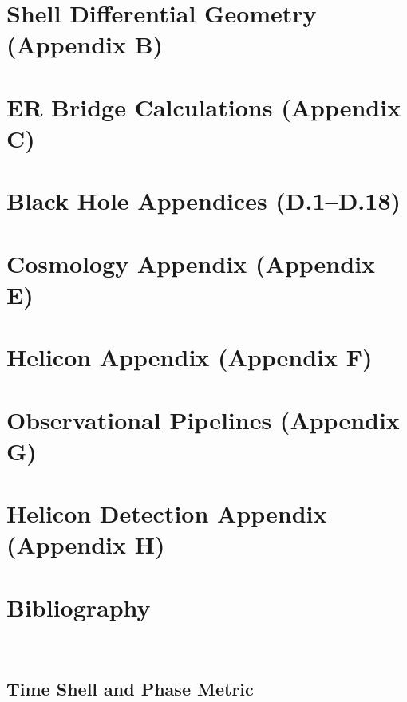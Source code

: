 \chapter{Shell Differential Geometry (Appendix B)}
\chapter{ER Bridge Calculations (Appendix C)}
\chapter{Black Hole Appendices (D.1--D.18)}
\chapter{Cosmology Appendix (Appendix E)}
\chapter{Helicon Appendix (Appendix F)}
\chapter{Observational Pipelines (Appendix G)}
\chapter{Helicon Detection Appendix (Appendix H)}

\backmatter

\chapter*{Bibliography}




\

\appendix
\renewcommand{\thesection}{\Alph{section}}
\setcounter{section}{0}

\section{Time Shell and Phase Metric}
\label{app:timeshell}

